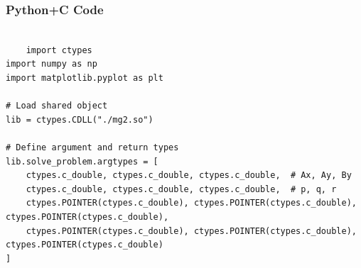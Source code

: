 \documentclass{beamer}
\begin{document}
\begin{frame}[fragile]
    \frametitle{Python+C Code}
    \begin{lstlisting}

    import ctypes
import numpy as np
import matplotlib.pyplot as plt

# Load shared object
lib = ctypes.CDLL("./mg2.so")

# Define argument and return types
lib.solve_problem.argtypes = [
    ctypes.c_double, ctypes.c_double, ctypes.c_double,  # Ax, Ay, By
    ctypes.c_double, ctypes.c_double, ctypes.c_double,  # p, q, r
    ctypes.POINTER(ctypes.c_double), ctypes.POINTER(ctypes.c_double), ctypes.POINTER(ctypes.c_double),
    ctypes.POINTER(ctypes.c_double), ctypes.POINTER(ctypes.c_double), ctypes.POINTER(ctypes.c_double)
]
\end{lstlisting}
\end{frame}
\end{document}
